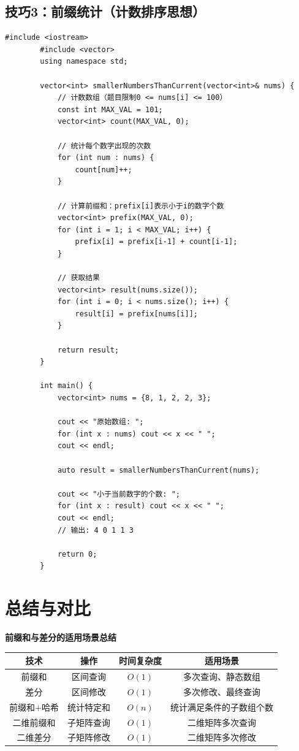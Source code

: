 \documentclass[12pt,a4paper]{article}
\begin{document}
	\subsection{技巧3：前缀统计（计数排序思想）}
	
	\begin{lstlisting}[caption={前缀统计：有多少小于当前数字的数字}]
		#include <iostream>
		#include <vector>
		using namespace std;
		
		vector<int> smallerNumbersThanCurrent(vector<int>& nums) {
			// 计数数组（题目限制0 <= nums[i] <= 100）
			const int MAX_VAL = 101;
			vector<int> count(MAX_VAL, 0);
			
			// 统计每个数字出现的次数
			for (int num : nums) {
				count[num]++;
			}
			
			// 计算前缀和：prefix[i]表示小于i的数字个数
			vector<int> prefix(MAX_VAL, 0);
			for (int i = 1; i < MAX_VAL; i++) {
				prefix[i] = prefix[i-1] + count[i-1];
			}
			
			// 获取结果
			vector<int> result(nums.size());
			for (int i = 0; i < nums.size(); i++) {
				result[i] = prefix[nums[i]];
			}
			
			return result;
		}
		
		int main() {
			vector<int> nums = {8, 1, 2, 2, 3};
			
			cout << "原始数组: ";
			for (int x : nums) cout << x << " ";
			cout << endl;
			
			auto result = smallerNumbersThanCurrent(nums);
			
			cout << "小于当前数字的个数: ";
			for (int x : result) cout << x << " ";
			cout << endl;
			// 输出: 4 0 1 1 3
			
			return 0;
		}
	\end{lstlisting}
	
	\section{总结与对比}
	
	\begin{greenbox}
		\textbf{前缀和与差分的适用场景总结}
		
		\begin{center}
			\begin{tabular}{|c|c|c|c|}
				\hline
				\textbf{技术} & \textbf{操作} & \textbf{时间复杂度} & \textbf{适用场景} \\
				\hline
				前缀和 & 区间查询 & $O(1)$ & 多次查询、静态数组 \\
				\hline
				差分 & 区间修改 & $O(1)$ & 多次修改、最终查询 \\
				\hline
				前缀和+哈希 & 统计特定和 & $O(n)$ & 统计满足条件的子数组个数 \\
				\hline
				二维前缀和 & 子矩阵查询 & $O(1)$ & 二维矩阵多次查询 \\
				\hline
				二维差分 & 子矩阵修改 & $O(1)$ & 二维矩阵多次修改 \\
				\hline
			\end{tabular}
		\end{center}
	\end{greenbox}
	
\end{document}
